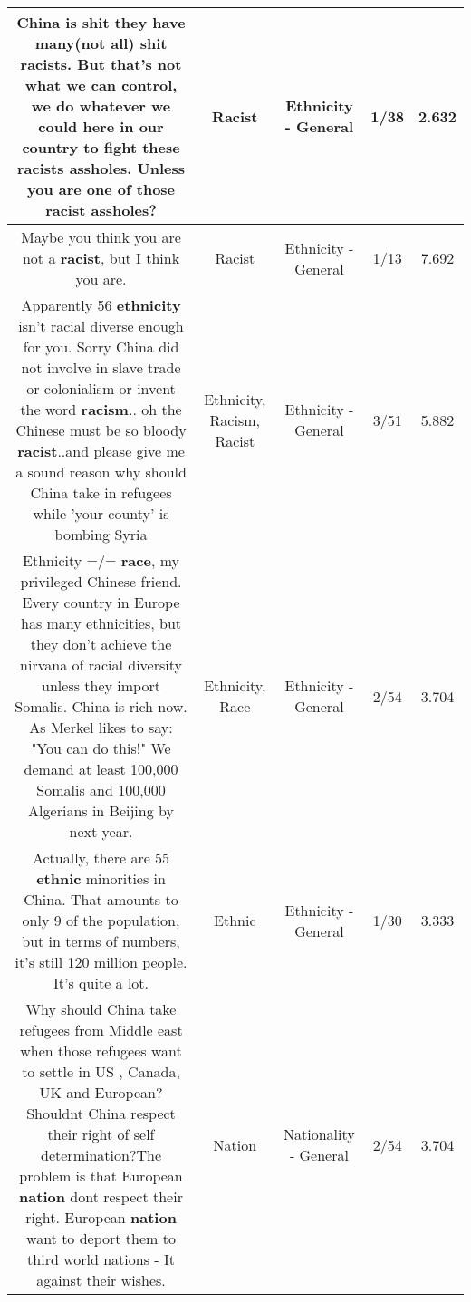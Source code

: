 \documentclass[11pt]{article}
\newlength\mylength
\begin{document}
\begin{center}
\begin{longtable}{|C{.65\mylength}|C{.30\mylength}|C{.12\mylength}|C{.12\mylength}|C{.12\mylength}|}
  \small China is shit they have many(not all) shit racists. But that's not what we can control, we do whatever we could here in our country to fight these racists assholes. Unless you are one of those \textbf{racist} assholes?\normalsize   & Racist & Ethnicity - General & 1/38 & 2.632 \\  \hline
  \small Maybe you think you are not a \textbf{racist}, but I think you are.\normalsize   & Racist & Ethnicity - General & 1/13 & 7.692 \\  \hline
  \small Apparently 56 \textbf{ethnicity} isn't racial diverse enough for you. Sorry China did not involve in slave trade or colonialism or invent the word \textbf{racism}.. oh the Chinese must be so bloody \textbf{racist}..and please give me a sound reason why should China take in refugees while 'your county' is bombing Syria\normalsize   & Ethnicity, Racism, Racist & Ethnicity - General & 3/51 & 5.882 \\  \hline
  \small Ethnicity =/= \textbf{race}, my privileged Chinese friend.  Every country in Europe has many ethnicities, but they don't achieve the nirvana of racial diversity unless they import Somalis.  China is rich now.  As Merkel likes to say: "You can do this!"  We demand at least 100,000 Somalis and 100,000 Algerians in Beijing by next year.\normalsize   & Ethnicity, Race & Ethnicity - General & 2/54 & 3.704 \\  \hline
  \small Actually, there are 55 \textbf{ethnic} minorities in China. That amounts to only 9 of the population, but in terms of numbers, it's still 120 million people. It's quite a lot.\normalsize   & Ethnic & Ethnicity - General & 1/30 & 3.333 \\  \hline
  \small Why should China take refugees from Middle east when those refugees want to settle in US , Canada, UK and European?Shouldnt China respect their right of self determination?The problem is that European \textbf{nation} dont respect their right.  European \textbf{nation} want to deport them to third world nations - It against their wishes.\normalsize   & Nation & Nationality - General & 2/54 & 3.704 \\  \hline

\end{longtable}
\end{center}
\end{document}
